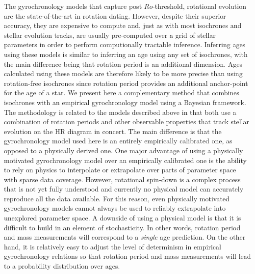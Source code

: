 The \citet{vansaders2016} gyrochronology models that capture post
$Ro$-threshold, rotational evolution are the state-of-the-art in rotation
dating.
However, despite their superior accuracy, they are expensive to compute and,
just as with most isochrones and stellar evolution tracks, are usually
pre-computed over a grid of stellar parameters in order to perform
computionally tractable inference.
Inferring ages using these models is similar to inferring an age using any set
of isochrones, with the main difference being that rotation period is an
additional dimension.
Ages calculated using these models are therefore likely to be more precise
than using rotation-free isochrones since rotation period provides an
additional anchor-point for the age of a star.
We present here a complementary method that combines isochrones with an
empirical gyrochronology model using a Bayesian framework.
The methodology is related to the \citet{vansaders2016} models described above
in that both use a combination of rotation periods and other observable
properties that track stellar evolution on the HR diagram in concert.
The main difference is that the gyrochronology model used here is an entirely
empirically calibrated one, as opposed to a physically derived one.
One major advantage of using a physically motivated gyrochronology model over
an empirically calibrated one is the ability to rely on physics to interpolate
or extrapolate over parts of parameter space with sparse data coverage.
However, rotational spin-down is a complex process that is not yet fully
understood and currently no physical model can accurately reproduce all the
data available.
For this reason, even physically motivated gyrochronology models cannot always
be used to reliably extrapolate into unexplored parameter space.
A downside of using a physical model is that it is difficult to build in an
element of stochasticity.
In other words, rotation period and mass measurements will correspond to a
{\it single} age prediction.
On the other hand, it is relatively easy to adjust the level of determinism in
empirical gyrochronology relations so that rotation period and mass
measurements will lead to a probability distribution over ages.
